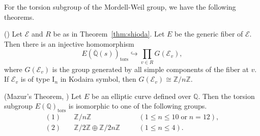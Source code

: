 \documentclass[main]{subfiles}
\begin{document}
For the torsion subgroup of the Mordell-Weil group, we have the following theorems.
\begin{thm}{(\cite[Lem.3.5]{ref:naskrecki2013})}
    \label{thm:torsion}
    Let $\mathcal{E}$ and $R$ be as in Theorem~\ref{thm:shioda}.
    Let $E$ be the generic fiber of $\mathcal{E}$.
    Then there is an injective homomorphism
    \begin{equation*}
        E(\overline{\mathbb{Q}}(s))_{\text{tors}} \hookrightarrow \prod_{v \in R} G(\mathcal{E}_{v}),
    \end{equation*}
    where $G(\mathcal{E}_{v})$ is the group generated by all simple components of the fiber at $v$.
    If $\mathcal{E}_{v}$ is of type $\mathrm{I}_n$ in Kodaira symbol, then $G(\mathcal{E}_{v}) \cong \mathbb{Z} / n \mathbb{Z}$.
\end{thm}

\begin{thm}{(Mazur's Theorem, \cite[Theorem VIII.7.5.]{ref:aec})}
    \label{thm:mazur}
    Let $E$ be an elliptic curve defined over $\mathbb{Q}$.
    Then the torsion subgroup $E(\mathbb{Q})_{\text{tors}}$ is isomorphic to one of the following groups.
    \begin{align*}
        (1) & \quad \mathbb{Z} / n \mathbb{Z} \quad                                   &  & (1 \leq n \leq 10 \; \text{or}\; n = 12), \\
        (2) & \quad \mathbb{Z} / 2 \mathbb{Z} \oplus \mathbb{Z} / 2n \mathbb{Z} \quad &  & (1 \leq n \leq 4).
    \end{align*}
\end{thm}
\end{document}
